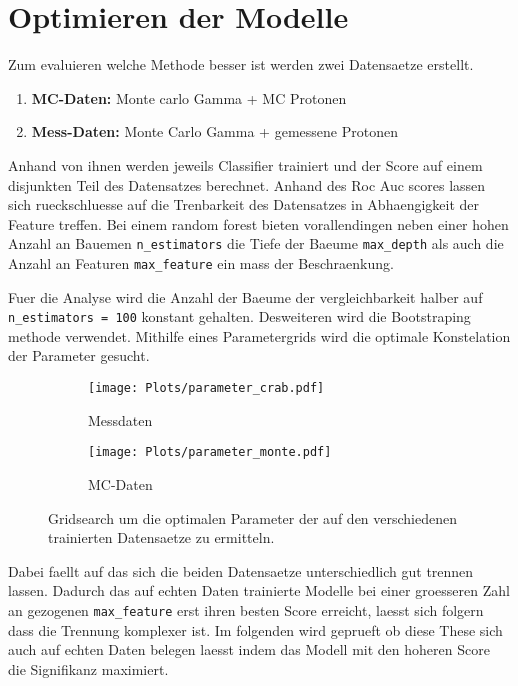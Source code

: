 \section{Optimieren der Modelle}
Zum evaluieren welche Methode besser ist werden zwei Datensaetze erstellt. 
\begin{enumerate}
  \item \textbf{MC-Daten:} Monte carlo Gamma + MC Protonen
  \item \textbf{Mess-Daten:} Monte Carlo Gamma + gemessene Protonen 
\end{enumerate}
Anhand von ihnen werden jeweils Classifier trainiert und der Score auf einem disjunkten Teil des Datensatzes berechnet. 
Anhand des Roc Auc scores lassen sich rueckschluesse auf die Trenbarkeit des Datensatzes in Abhaengigkeit der Feature treffen. 
Bei einem random forest bieten vorallendingen neben einer hohen Anzahl an Bauemen \texttt{n\_estimators} die Tiefe der Baeume \texttt{max\_depth} als auch die Anzahl an Featuren \texttt{max\_feature} ein mass der Beschraenkung.

Fuer die Analyse wird die Anzahl der Baeume der vergleichbarkeit halber auf \texttt{n\_estimators = 100} konstant gehalten. 
Desweiteren wird die Bootstraping methode verwendet. 
Mithilfe eines Parametergrids wird die optimale Konstelation der Parameter gesucht. 
\begin{figure}
  \begin{subfigure}[b]{0.5\textwidth}
	\texttt{[image: Plots/parameter\_crab.pdf]}
	\caption{Messdaten}
	\label{fig:messGrid}
  \end{subfigure}
  \begin{subfigure}[b]{0.5\textwidth}
	\texttt{[image: Plots/parameter\_monte.pdf]}
	\caption{MC-Daten}
	\label{fig:mcGrid}
  \end{subfigure}
  \caption{Gridsearch um die optimalen Parameter der auf den verschiedenen trainierten Datensaetze zu ermitteln.}
\end{figure}

Dabei faellt auf das sich die beiden Datensaetze unterschiedlich gut trennen lassen.
Dadurch das auf echten Daten trainierte Modelle bei einer groesseren Zahl an gezogenen \texttt{max\_feature} erst ihren besten Score erreicht, laesst sich folgern dass die Trennung komplexer ist.
Im folgenden wird geprueft ob diese These sich auch auf echten Daten belegen laesst indem das Modell mit den hoheren Score die Signifikanz maximiert.
